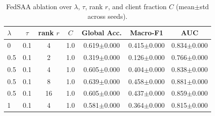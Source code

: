 \begin{table}[t]
\centering
\caption{FedSAA ablation over $\lambda$, $\tau$, rank $r$, and client fraction $C$ (mean$\pm$std across seeds).}
\label{tab:ablations}
\begin{tabular}{lcccccc}
\toprule
$\lambda$ & $\tau$ & rank $r$ & $C$ & Global Acc. & Macro-F1 & AUC \\
\midrule
0 & 0.1 & 4 & 1.0 & 0.619$\pm$0.000 & 0.415$\pm$0.000 & 0.834$\pm$0.000 \\
0.5 & 0.1 & 2 & 1.0 & 0.319$\pm$0.000 & 0.126$\pm$0.000 & 0.766$\pm$0.000 \\
0.5 & 0.1 & 4 & 1.0 & 0.605$\pm$0.000 & 0.404$\pm$0.000 & 0.838$\pm$0.000 \\
0.5 & 0.1 & 8 & 1.0 & 0.639$\pm$0.000 & 0.458$\pm$0.000 & 0.881$\pm$0.000 \\
0.5 & 0.1 & 16 & 1.0 & 0.605$\pm$0.000 & 0.437$\pm$0.000 & 0.859$\pm$0.000 \\
1 & 0.1 & 4 & 1.0 & 0.581$\pm$0.000 & 0.364$\pm$0.000 & 0.815$\pm$0.000 \\
\bottomrule
\end{tabular}
\end{table}
